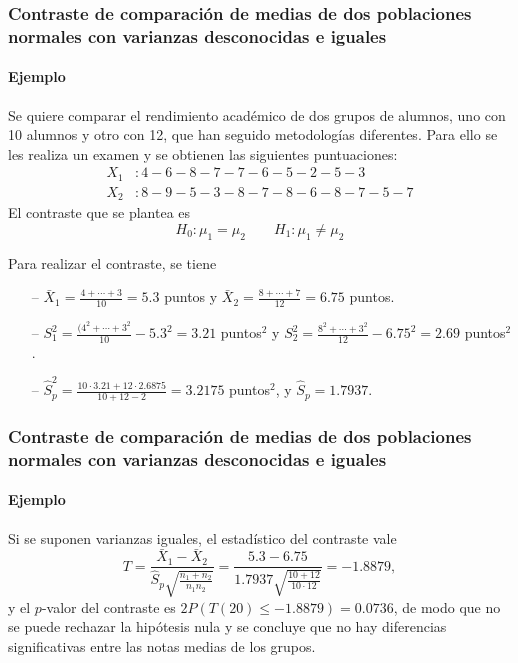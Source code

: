 \begin{frame}
\frametitle{Contraste de comparación de medias de dos poblaciones normales con varianzas desconocidas e iguales}
\framesubtitle{Ejemplo}
Se quiere comparar el rendimiento académico de dos grupos de alumnos, uno con 10 alumnos y otro con 12, que han seguido metodologías diferentes. Para ello se les realiza un examen y se obtienen las siguientes puntuaciones:
\begin{align*}
X_1 &: 4 - 6 - 8 - 7 - 7 - 6 - 5 - 2 - 5 - 3 \\
X_2 &: 8 - 9 - 5 - 3 - 8 - 7 - 8 - 6 - 8 - 7 - 5 - 7
\end{align*}
El contraste que se plantea es
\[
H_0: \mu_1=\mu_2\qquad H_1: \mu_1\neq \mu_2
\]

Para realizar el contraste, se tiene
\begin{itemize}
\item[--] $\bar{X}_1 = \frac{4+\cdots +3}{10}=5.3$ puntos y $\bar{X}_2=\frac{8+\cdots +7}{12}=6.75$ puntos.
\item[--] $S_1^2= \frac{(4^2+\cdots + 3^2}{10}-5.3^2=3.21$ puntos$^2$ y $S_2^2= \frac{8^2+\cdots +3^2}{12}-6.75^2=2.69$
puntos$^2$.
\item[--] $\hat{S}_p^2 = \frac{10\cdot 3.21+12\cdot 2.6875}{10+12-2}= 3.2175$ puntos$^2$, y $\hat S_p=1.7937$.
\end{itemize}
\end{frame}


\begin{frame}
\frametitle{Contraste de comparación de medias de dos poblaciones normales con varianzas desconocidas e iguales}
\framesubtitle{Ejemplo}
Si se suponen varianzas iguales, el estadístico del contraste vale
\[
T=\frac{\bar{X}_1-\bar{X}_2}{\hat{S}_p\sqrt{\frac{n_1+n_2}{n_1n_2}}} = \frac{5.3-6.75}{1.7937\sqrt{\frac{10+12}{10\cdot 12}}} = -1.8879,
\]
y el $p$-valor del contraste es $2P(T(20)\leq -1.8879) = 0.0736$, de modo que no se puede rechazar la hipótesis nula y se concluye que no hay diferencias significativas entre las notas medias de los grupos.
\end{frame}


